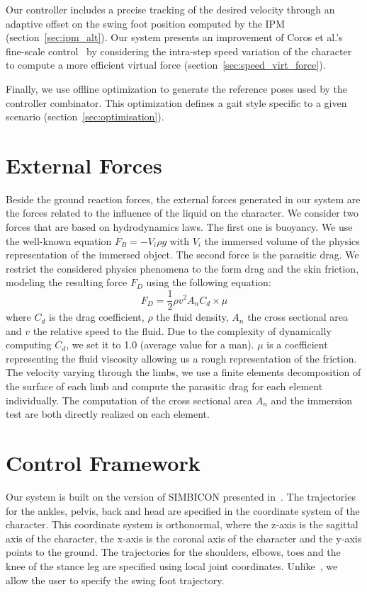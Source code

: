 \documentclass[conference]{acmsiggraph}
\begin{document}
Our controller includes a precise tracking of the desired velocity through an adaptive offset on the swing foot position computed by the IPM (section~\ref{sec:ipm_alt}). Our system presents an improvement of Coros et al.'s fine-scale control~\cite{coros2010generalized} by considering the intra-step speed variation of the character to compute a more efficient virtual force (section~\ref{sec:speed_virt_force}).

Finally, we use offline optimization to generate the reference poses used by the controller combinator. This optimization defines a gait style specific to a given scenario (section~\ref{sec:optimisation}).

\section{External Forces}
\label{sec:ext_forces}

Beside the ground reaction forces, the external forces generated in our system are the forces related to the influence of the liquid on the character. We consider two forces that are based on hydrodynamics laws. The first one is buoyancy. We use the well-known equation $F_{B}=-V_i \rho g$ with $V_i$ the immersed volume of the physics representation of the immersed object. The second force	 is the parasitic drag. We restrict the considered physics phenomena to the form drag and the skin friction, modeling the resulting force $F_D$ using the following equation:
$$
F_D=\frac{1}{2} \rho v^2 A_n C_d \times \mu
$$
where $C_d$ is the drag coefficient, $\rho$ the fluid density, $A_n$ the cross sectional area and $v$ the relative speed to the fluid. Due to the complexity of dynamically computing $C_d$, we set it to 1.0 (average value for a man). $\mu$ is a coefficient representing the fluid viscosity allowing us a rough representation of the friction. The velocity varying through the limbs, we use a finite elements decomposition of the surface of each limb and compute the parasitic drag for each element individually. The computation of the cross sectional area $A_n$ and the immersion test are both directly realized on each element.

\section{Control Framework}
\label{sec:control_framework}

Our system is built on the version of SIMBICON presented in~\cite{coros2010generalized}. The trajectories for the ankles, pelvis, back and head are specified in the coordinate system of the character. This coordinate system is orthonormal, where the z-axis is the sagittal axis of the character, the x-axis is the coronal axis of the character and the y-axis points to the ground. The trajectories for the shoulders, elbows, toes and the knee of the stance leg are specified using local joint coordinates. Unlike~\cite{coros2010generalized}, we allow the user to specify the swing foot trajectory. 
\end{document}
